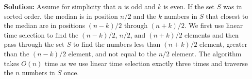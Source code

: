 \documentclass[12pt]{article}
\begin{document}
\begin{enumerate}
  {\bf Solution:} Assume for simplicity that $n$ is odd and $k$ is even.
  If the set $S$ was in sorted order, the median is in position $n/2$ and
  the $k$ numbers in $S$ that closest to the median are in positions
  $(n-k)/2$ through $(n+k)/2$.  We first use linear time selection to find
  the $(n-k)/2$, $n/2$, and $(n+k)/2$ elements and then pass through the
  set $S$ to find the numbers less than $(n+k)/2$ element, greater than the
  $(n-k)/2$ element, and not equal to the $n/2$ element.  The algorithm
  takes $O(n)$ time as we use linear time selection exactly three times and
  traverse the $n$ numbers in $S$ once.


\end{enumerate}
\end{document}
